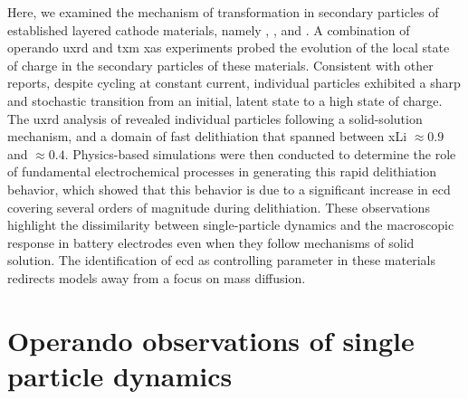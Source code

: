 \documentclass{article}
\begin{document}
Here, we examined the mechanism of transformation in secondary
particles of established layered cathode materials, namely \nca{},
\nmc[333]{}, and \nmc[532]{}. A combination of operando \gls{uxrd} and
\gls{txm} \gls{xas} experiments probed the evolution of the local
state of charge in the secondary particles of these
materials. Consistent with other reports, despite cycling at constant
current, individual particles exhibited a sharp and stochastic
transition from an initial, latent state to a high state of
charge. The \gls{uxrd} analysis of \nca{} revealed individual
particles following a solid-solution mechanism, and a domain of fast
delithiation that spanned between \gls{xLi} $\approx 0.9$ and $\approx
0.4$.  Physics-based simulations were then conducted to determine the
role of fundamental electrochemical processes in generating this rapid
delithiation behavior, which showed that this behavior is due to a
significant increase in \gls{ecd} covering several orders of magnitude
during delithiation. These observations highlight the dissimilarity
between single-particle dynamics and the macroscopic response in
battery electrodes even when they follow mechanisms of solid
solution. The identification of \gls{ecd} as controlling parameter in
these materials redirects models away from a focus on mass diffusion.

\section{Operando observations of single particle dynamics}

\end{document}
